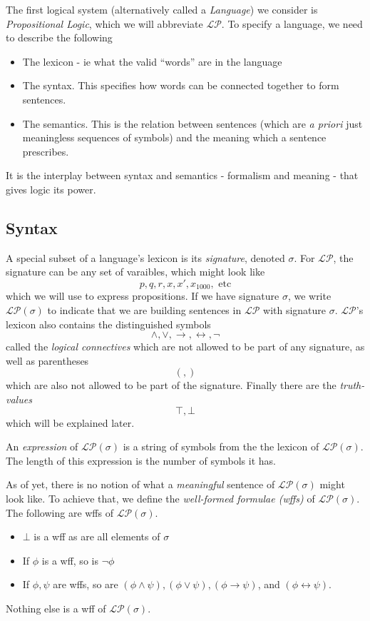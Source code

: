 The first logical system (alternatively called a \emph{Language}) we consider is \emph{Propositional Logic}, which we will abbreviate $\mathcal{LP}$. To specify a language, we need to describe the following
\begin{itemize}
  \item The lexicon - ie what the valid ``words'' are in the language
  \item The syntax. This specifies how words can be connected together to form sentences. 
  \item The semantics. This is the relation between sentences (which are \emph{a priori} just meaningless sequences of symbols) and the meaning which a sentence prescribes. 
\end{itemize}
It is the interplay between syntax and semantics - formalism and meaning - that gives logic its power. 

\subsection*{Syntax}
A special subset of a language's lexicon is its \emph{signature}, denoted $\sigma$. For $\mathcal{LP}$, the signature can be any set of varaibles, which might look like
\[
  p, q, r, x, x', x_{1000}, \text{ etc}
\]
which we will use to express propositions. If we have signature $\sigma$, we write $\mathcal{LP}(\sigma)$ to indicate that we are building sentences in $\mathcal{LP}$ with signature $\sigma$. $\mathcal{LP}$'s lexicon also contains the distinguished symbols
\[
  \land, \vee, \rightarrow,  \leftrightarrow, \lnot
\]
called the \emph{logical connectives} which are not allowed to be part of any signature, as well as parentheses 
\[
  (, )
\]
which are also not allowed to be part of the signature. Finally there are the \emph{truth-values}
\[
  \top, \bot
\]
which will be explained later. 

An \emph{expression} of $\mathcal{LP}(\sigma)$ is a string of symbols from the the lexicon of $\mathcal{LP}(\sigma)$. The length of this expression is the number of symbols it has. 

As of yet, there is no notion of what a \emph{meaningful} sentence of $\mathcal{LP}(\sigma)$ might look like. To achieve that, we define the \emph{well-formed formulae (wffs)} of $\mathcal{LP}(\sigma)$. The following are wffs of $\mathcal{LP}(\sigma)$. 
\begin{itemize}
  \item $\bot$ is a wff as are all elements of $\sigma$
  \item If $\phi$ is a wff, so is $\lnot \phi$
  \item If $\phi, \psi$ are wffs, so are $(\phi \land \psi), (\phi \vee \psi), (\phi \rightarrow \psi)$, and $(\phi \leftrightarrow \psi)$.
\end{itemize}
Nothing else is a wff of $\mathcal{LP}(\sigma)$. 

